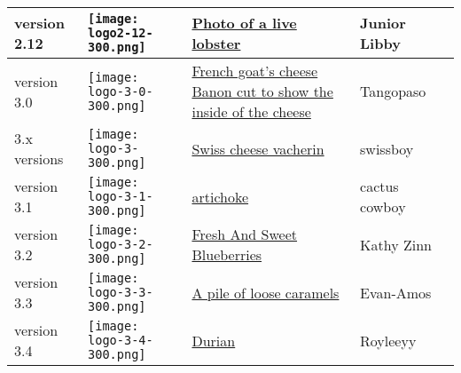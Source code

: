 \begin{longtable}{| l | l | p{3.5cm} | p{3cm} | l |}
	\\\hline
	version 2.12 & \texttt{[image: logo2-12-300.png]} & \href{https://publicdomainpictures.net/en/view-image.php?image=39798&picture=lobster}{Photo of a live lobster} & Junior Libby & \cczero{}
	\\\hline
	version 3.0 & \texttt{[image: logo-3-0-300.png]} & \href{https://commons.wikimedia.org/wiki/File:Banon2.jpg}{French goat's cheese Banon cut to show the inside of the cheese} & Tangopaso & \publicdomain{}
	\\\hline
	3.x versions & \texttt{[image: logo-3-300.png]} & \href{https://openclipart.org/detail/308414/swiss-cheese-vacherin-swiss-food}{Swiss cheese vacherin} & swissboy & \publicdomain{}
	\\\hline
	version 3.1 & \texttt{[image: logo-3-1-300.png]} & \href{https://openclipart.org/detail/291385/artichoke}{artichoke} & cactus cowboy & \publicdomain{}
	\\\hline
	version 3.2 & \texttt{[image: logo-3-2-300.png]} & \href{https://www.publicdomainpictures.net/en/view-image.php?image=117097&picture=fresh-and-sweet-blueberries}{Fresh And Sweet Blueberries} & Kathy Zinn & \cczero{}
	\\\hline
	version 3.3 & \texttt{[image: logo-3-3-300.png]} & \href{https://commons.wikimedia.org/wiki/File:Caramels.jpg}{A pile of loose caramels} & Evan-Amos & \ccbysathree{}
	\\\hline
	version 3.4 & \texttt{[image: logo-3-4-300.png]} & \href{https://commons.wikimedia.org/wiki/File:D24_-_Durian.jpg}{Durian} & Royleeyy & \ccbysafour{}
	\\\hline
\end{longtable}


